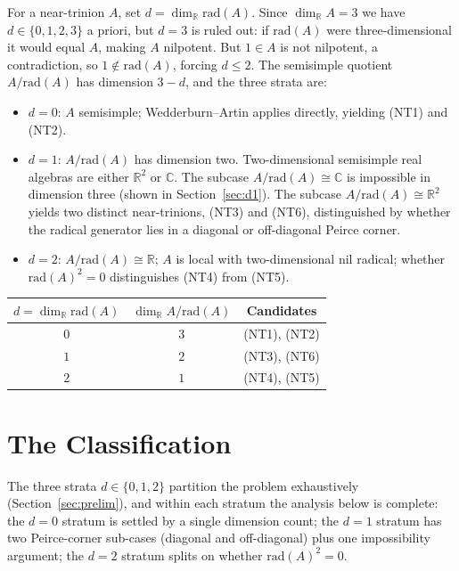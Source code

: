 \documentclass{amsart}
\theoremstyle{plain}
\theoremstyle{definition}
\theoremstyle{remark}
\newcommand{\RR}{\mathbb{R}}
\newcommand{\CC}{\mathbb{C}}
\newcommand{\Jac}{\mathrm{rad}}
\begin{document}
For a near-trinion $A$, set $d = \dim_\RR \Jac(A)$.
Since $\dim_\RR A = 3$ we have $d \in \{0,1,2,3\}$ a priori, but $d = 3$
is ruled out: if $\Jac(A)$ were three-dimensional it would equal $A$,
making $A$ nilpotent.
But $1 \in A$ is not nilpotent, a contradiction, so $1 \notin \Jac(A)$, forcing $d \leq 2$.
The semisimple quotient $A/\Jac(A)$ has dimension $3 - d$, and the three
strata are:

\begin{itemize}
  \item $d = 0$: $A$ semisimple; Wedderburn--Artin applies directly,
    yielding (NT1) and (NT2).

  \item $d = 1$: $A/\Jac(A)$ has dimension two.
    Two-dimensional semisimple real algebras are either $\RR^2$ or $\CC$.
    The subcase $A/\Jac(A) \cong \CC$ is impossible in dimension three
    (shown in Section~\ref{sec:d1}).
    The subcase $A/\Jac(A) \cong \RR^2$ yields two distinct near-trinions,
    (NT3) and (NT6), distinguished by whether the radical generator
    lies in a diagonal or off-diagonal Peirce corner.

  \item $d = 2$: $A/\Jac(A) \cong \RR$; $A$ is local with two-dimensional
    nil radical; whether $\Jac(A)^2 = 0$ distinguishes (NT4) from (NT5).
\end{itemize}

\begin{center}
\renewcommand{\arraystretch}{1.3}
\begin{tabular}{ccc}
  \toprule
  $d = \dim_\RR \Jac(A)$ & $\dim_\RR A/\Jac(A)$ & Candidates \\
  \midrule
  $0$ & $3$ & (NT1), (NT2) \\
  $1$ & $2$ & (NT3), (NT6) \\
  $2$ & $1$ & (NT4), (NT5) \\
  \bottomrule
\end{tabular}
\end{center}

\section{The Classification}\label{sec:classification}

The three strata $d \in \{0,1,2\}$ partition the problem exhaustively
(Section~\ref{sec:prelim}), and within each stratum the analysis below is
complete: the $d=0$ stratum is settled by a single dimension count;
the $d=1$ stratum has two Peirce-corner sub-cases (diagonal and off-diagonal)
plus one impossibility argument; the $d=2$ stratum splits on whether
$\Jac(A)^2=0$.
\end{document}
